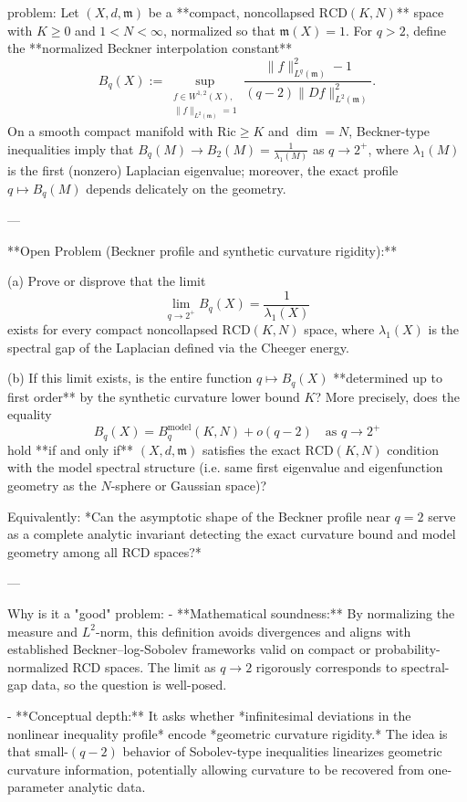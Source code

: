 problem:  
Let \((X,d,\mathfrak{m})\) be a **compact, noncollapsed \(\mathrm{RCD}(K,N)\)** space with \(K\ge0\) and \(1<N<\infty\), normalized so that \(\mathfrak{m}(X)=1\).  
For \(q>2\), define the **normalized Beckner interpolation constant**
\[
B_q(X)
:=\sup_{\substack{f\in W^{1,2}(X),\\ \|f\|_{L^2(\mathfrak{m})}=1}}
\frac{\|f\|_{L^q(\mathfrak{m})}^2-1}{(q-2)\|Df\|_{L^2(\mathfrak{m})}^2}.
\]
On a smooth compact manifold with \(\mathrm{Ric}\ge K\) and \(\dim = N\), Beckner-type inequalities imply that \(B_q(M)\to B_2(M)=\frac{1}{\lambda_1(M)}\) as \(q\to2^+\), where \(\lambda_1(M)\) is the first (nonzero) Laplacian eigenvalue; moreover, the exact profile \(q\mapsto B_q(M)\) depends delicately on the geometry.

---

**Open Problem (Beckner profile and synthetic curvature rigidity):**  

(a)  Prove or disprove that the limit
\[
\lim_{q\to2^+} B_q(X)=\frac{1}{\lambda_1(X)}
\]
exists for every compact noncollapsed \(\mathrm{RCD}(K,N)\) space, where \(\lambda_1(X)\) is the spectral gap of the Laplacian defined via the Cheeger energy.  

(b)  If this limit exists, is the entire function \(q\mapsto B_q(X)\) **determined up to first order** by the synthetic curvature lower bound \(K\)?  More precisely, does the equality
\[
B_q(X)=B_q^{\mathrm{model}}(K,N)+o(q-2)
\quad\text{as }q\to2^+
\]
hold **if and only if**
\((X,d,\mathfrak{m})\) satisfies the exact \(\mathrm{RCD}(K,N)\) condition with the model spectral structure (i.e. same first eigenvalue and eigenfunction geometry as the \(N\)-sphere or Gaussian space)?  

Equivalently: *Can the asymptotic shape of the Beckner profile near \(q=2\) serve as a complete analytic invariant detecting the exact curvature bound and model geometry among all RCD spaces?*

---

Why is it a "good" problem:  
- **Mathematical soundness:**  
  By normalizing the measure and \(L^2\)-norm, this definition avoids divergences and aligns with established Beckner–log-Sobolev frameworks valid on compact or probability-normalized RCD spaces.  The limit as \(q\to2\) rigorously corresponds to spectral-gap data, so the question is well-posed.

- **Conceptual depth:**  
  It asks whether *infinitesimal deviations in the nonlinear inequality profile* encode *geometric curvature rigidity.*  The idea is that small-\((q-2)\) behavior of Sobolev-type inequalities linearizes geometric curvature information, potentially allowing curvature to be recovered from one-parameter analytic data.

